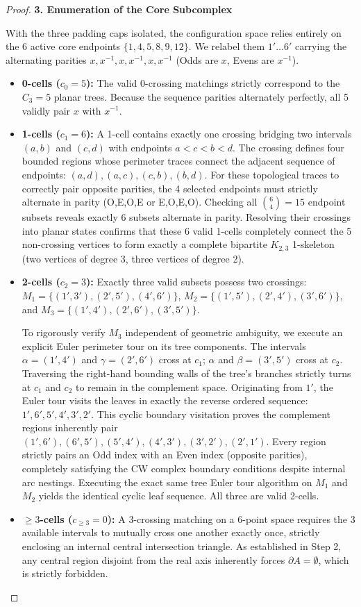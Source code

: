\documentclass[12pt]{article}
\begin{document}
\begin{proof}
\vspace{1em}
\noindent\textbf{3. Enumeration of the Core Subcomplex}

With the three padding caps isolated, the configuration space relies entirely on the 6 active core endpoints $\{1, 4, 5, 8, 9, 12\}$. We relabel them $1' \dots 6'$ carrying the alternating parities $x, x^{-1}, x, x^{-1}, x, x^{-1}$ (Odds are $x$, Evens are $x^{-1}$).
\begin{itemize}
    \item \textbf{0-cells ($c_0=5$):} The valid 0-crossing matchings strictly correspond to the $C_3 = 5$ planar trees. Because the sequence parities alternately perfectly, all 5 validly pair $x$ with $x^{-1}$.
    \item \textbf{1-cells ($c_1=6$):} A 1-cell contains exactly one crossing bridging two intervals $(a,b)$ and $(c,d)$ with endpoints $a < c < b < d$. The crossing defines four bounded regions whose perimeter traces connect the adjacent sequence of endpoints: $(a,d), (a,c), (c,b), (b,d)$. For these topological traces to correctly pair opposite parities, the 4 selected endpoints must strictly alternate in parity (O,E,O,E or E,O,E,O). Checking all $\binom{6}{4}=15$ endpoint subsets reveals exactly 6 subsets alternate in parity. Resolving their crossings into planar states confirms that these 6 valid 1-cells completely connect the 5 non-crossing vertices to form exactly a complete bipartite $K_{2,3}$ 1-skeleton (two vertices of degree 3, three vertices of degree 2).
    \item \textbf{2-cells ($c_2=3$):} Exactly three valid subsets possess two crossings: $M_1 = \{(1',3'), (2',5'), (4',6')\}$, $M_2 = \{(1',5'), (2',4'), (3',6')\}$, and $M_3 = \{(1',4'), (2',6'), (3',5')\}$. 
    
    To rigorously verify $M_3$ independent of geometric ambiguity, we execute an explicit Euler perimeter tour on its tree components. The intervals $\alpha=(1',4')$ and $\gamma=(2',6')$ cross at $c_1$; $\alpha$ and $\beta=(3',5')$ cross at $c_2$. Traversing the right-hand bounding walls of the tree's branches strictly turns at $c_1$ and $c_2$ to remain in the complement space. Originating from $1'$, the Euler tour visits the leaves in exactly the reverse ordered sequence: $1', 6', 5', 4', 3', 2'$. This cyclic boundary visitation proves the complement regions inherently pair $(1',6'), (6',5'), (5',4'), (4',3'), (3',2'), (2',1')$. Every region strictly pairs an Odd index with an Even index (opposite parities), completely satisfying the CW complex boundary conditions despite internal arc nestings. Executing the exact same tree Euler tour algorithm on $M_1$ and $M_2$ yields the identical cyclic leaf sequence. All three are valid 2-cells.
    \item \textbf{$\geq 3$-cells ($c_{\geq 3}=0$):} A 3-crossing matching on a 6-point space requires the 3 available intervals to mutually cross one another exactly once, strictly enclosing an internal central intersection triangle. As established in Step 2, any central region disjoint from the real axis inherently forces $\partial A = \emptyset$, which is strictly forbidden. 
\end{itemize}


\end{proof}
\end{document}
